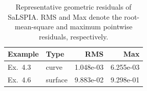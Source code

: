 \begin{table}[H]
\centering
\caption{Representative geometric residuals of SaLSPIA. RMS and Max denote the root-mean-square and maximum pointwise residuals, respectively.}
\label{tab:representative_geometric_errors}
\begin{tabular}{llrr}
\hline
Example & Type & RMS & Max \\
\hline
Ex.~4.3 & curve & 1.048e-03 & 6.255e-03 \\
Ex.~4.6 & surface & 9.883e-02 & 9.298e-01 \\
\hline
\end{tabular}
\end{table}
